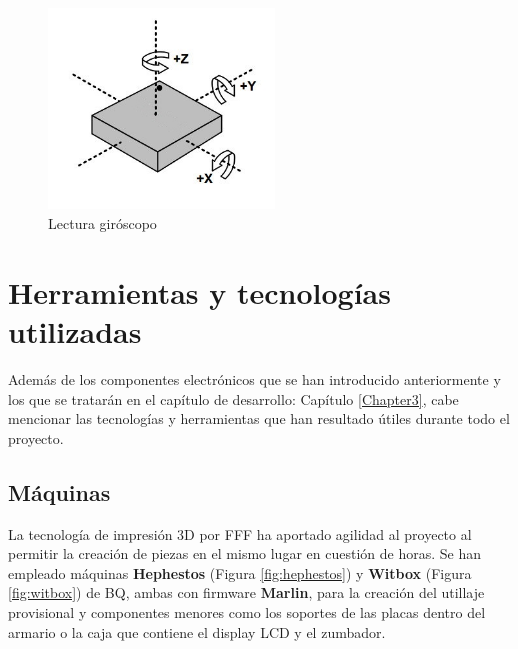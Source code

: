 \begin{figure}[h]
\centering
\includegraphics[width=60mm]{Figures/imus-giro.jpg}
\caption[Lectura giróscopo]{Lectura giróscopo}
\label{fig:ImuGiro}
\end{figure}

\section{Herramientas y tecnologías utilizadas}

Además de los componentes electrónicos que se han introducido anteriormente y los que se tratarán en el capítulo de desarrollo: Capítulo \ref{Chapter3}, cabe mencionar las tecnologías y herramientas que han resultado útiles durante todo el proyecto.

\subsection{Máquinas}

La tecnología de impresión 3D por FFF ha aportado agilidad al proyecto al permitir la creación de piezas en el mismo lugar en cuestión de horas. Se han empleado máquinas \textbf{Hephestos} (Figura \ref{fig:hephestos}) y \textbf{Witbox} (Figura \ref{fig:witbox}) de BQ, ambas con firmware \textbf{Marlin}, para la creación del utillaje provisional y componentes menores como los soportes de las placas dentro del armario o la caja que contiene el display LCD y el zumbador.

